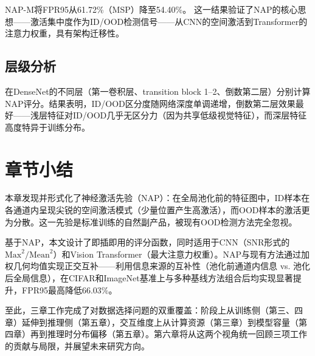 NAP-M将FPR95从61.72\%（MSP）降至54.40\%。%
这一结果验证了NAP的核心思想——激活集中度作为ID/OOD检测信号——从CNN的空间激活到Transformer的注意力权重，具有架构迁移性。

\subsection{层级分析}

在DenseNet的不同层（第一卷积层、transition block 1--2、倒数第二层）分别计算NAP评分。结果表明，ID/OOD区分度随网络深度单调递增，倒数第二层效果最好——浅层特征对ID/OOD几乎无区分力（因为共享低级视觉特征），而深层特征高度特异于训练分布。%


\section{章节小结}

本章发现并形式化了神经激活先验（NAP）：在全局池化前的特征图中，ID样本在各通道内呈现尖锐的空间激活模式（少量位置产生高激活），而OOD样本的激活更为分散。这一先验是标准训练的自然副产品，被现有OOD检测方法完全忽视。

基于NAP，本文设计了即插即用的评分函数，同时适用于CNN（SNR形式的$\text{Max}^2/\text{Mean}^2$）和Vision Transformer（最大注意力权重）。NAP与现有方法通过加权几何均值实现正交互补——利用信息来源的互补性（池化前通道内信息 vs. 池化后全局信息），在CIFAR和ImageNet基准上与多种基线方法组合后均实现显著提升，FPR95最高降低66.03\%。%

至此，三章工作完成了对数据选择问题的双重覆盖：阶段上从训练侧（第三、四章）延伸到推理侧（第五章），交互维度上从计算资源（第三章）到模型容量（第四章）再到推理时分布偏移（第五章）。第六章将从这两个视角统一回顾三项工作的贡献与局限，并展望未来研究方向。
